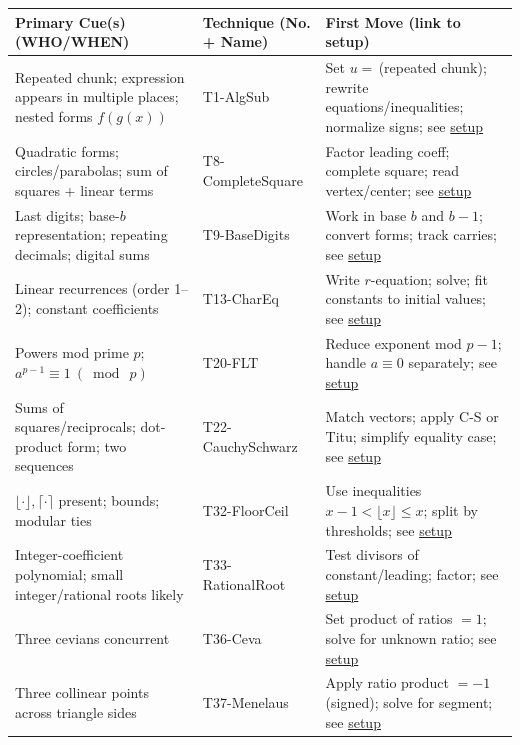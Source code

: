 \documentclass{article}
\begin{document}
\begin{center}
\begin{longtable}{|>{\raggedright\arraybackslash}m{}|>{\raggedright\arraybackslash}p{}|>{\raggedright\arraybackslash}p{}|}
\hline
\textbf{Primary Cue(s) (WHO/WHEN)} & \textbf{Technique (No. + Name)} & \textbf{First Move (link to setup)} \\
\hline
Repeated chunk; expression appears in multiple places; nested forms $f(g(x))$ & T1-AlgSub & Set $u=\,$(repeated chunk); rewrite equations/inequalities; normalize signs; see \hyperlink{technique-setup}{setup} \\
\hline
Quadratic forms; circles/parabolas; sum of squares + linear terms & T8-CompleteSquare & Factor leading coeff; complete square; read vertex/center; see \hyperlink{technique-setup}{setup} \\
\hline
Last digits; base-$b$ representation; repeating decimals; digital sums & T9-BaseDigits & Work in base $b$ and $b{-}1$; convert forms; track carries; see \hyperlink{technique-setup}{setup} \\
\hline
Linear recurrences (order 1–2); constant coefficients & T13-CharEq & Write $r$-equation; solve; fit constants to initial values; see \hyperlink{technique-setup}{setup} \\
\hline
Powers mod prime $p$; $a^{p-1}\equiv1\ (\bmod\ p)$ & T20-FLT & Reduce exponent mod $p{-}1$; handle $a\equiv0$ separately; see \hyperlink{technique-setup}{setup} \\
\hline
Sums of squares/reciprocals; dot-product form; two sequences & T22-CauchySchwarz & Match vectors; apply C-S or Titu; simplify equality case; see \hyperlink{technique-setup}{setup} \\
\hline
$\lfloor\cdot\rfloor,\lceil\cdot\rceil$ present; bounds; modular ties & T32-FloorCeil & Use inequalities $x-1<\lfloor x\rfloor\le x$; split by thresholds; see \hyperlink{technique-setup}{setup} \\
\hline
Integer-coefficient polynomial; small integer/rational roots likely & T33-RationalRoot & Test divisors of constant/leading; factor; see \hyperlink{technique-setup}{setup} \\
\hline
Three cevians concurrent & T36-Ceva & Set product of ratios $=1$; solve for unknown ratio; see \hyperlink{technique-setup}{setup} \\
\hline
Three collinear points across triangle sides & T37-Menelaus & Apply ratio product $=-1$ (signed); solve for segment; see \hyperlink{technique-setup}{setup} \\

\end{longtable}
\end{center}
\end{document}
